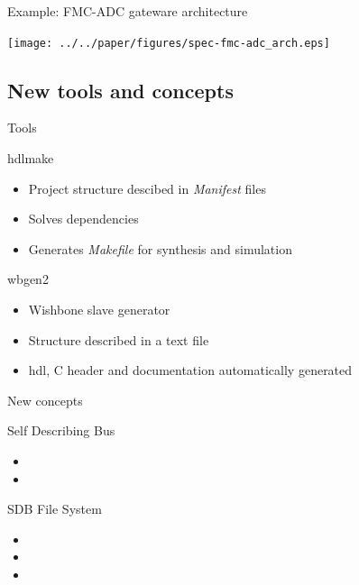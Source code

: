 \documentclass[compress,red]{beamer}
\begin{document}
\begin{frame}{Example: FMC-ADC gateware architecture}

  \begin{center}
    \texttt{[image: ../../paper/figures/spec-fmc-adc\_arch.eps]}
  \end{center}

\end{frame}

\subsection{New tools and concepts}

\begin{frame}{Tools}

  \begin{block}{hdlmake}
    \begin{itemize}
    \item Project structure descibed in \textit{Manifest} files
    \item Solves dependencies
    \item Generates \textit{Makefile} for synthesis and simulation
    \end{itemize}
  \end{block}

  \begin{block}{wbgen2}
    \begin{itemize}
    \item Wishbone slave generator
    \item Structure described in a text file
    \item hdl, C header and documentation automatically generated
    \end{itemize}
  \end{block}


\end{frame}

\begin{frame}{New concepts}

  \begin{block}{Self Describing Bus}
    \begin{itemize}
    \item
    \item
    \end{itemize}
  \end{block}

  \begin{block}{SDB File System}
    \begin{itemize}
    \item
    \item
    \item
    \end{itemize}
  \end{block}

\end{frame}
\end{document}
